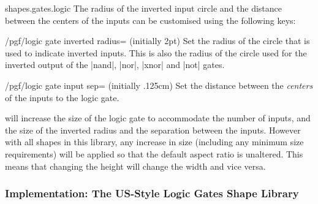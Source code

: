 \begin{pgflibrary}{shapes.gates.logic}
The radius of the inverted input circle and the distance between the 
centers of the inputs can be customised using the following keys:

\begin{key}{/pgf/logic gate inverted radius= (initially 2pt)}
  Set the radius of the circle that is used to indicate inverted
  inputs. This is also the radius of the circle used for the inverted
  output of the |nand|, |nor|, |xnor| and |not| gates. 
    
\begin{codeexample}[]
\end{codeexample} 
\end{key}

\begin{key}{/pgf/logic gate input sep= (initially .125cm)}
  Set the distance between the \emph{centers} of the inputs to the
  logic gate. 
  
\begin{codeexample}[]
\end{codeexample} 
\end{key}
 
  \pgfname{} will increase the size of the 
  logic gate to accommodate the number of inputs, and the size
  of the inverted radius and the separation between the inputs.
  However with all shapes in this library, any increase in size 
  (including any minimum size requirements) will be applied so that 
  the default aspect ratio is unaltered. This means that changing
  the height will change the width and vice versa. 

\end{pgflibrary}


\subsubsection{Implementation: The US-Style Logic Gates Shape Library}


